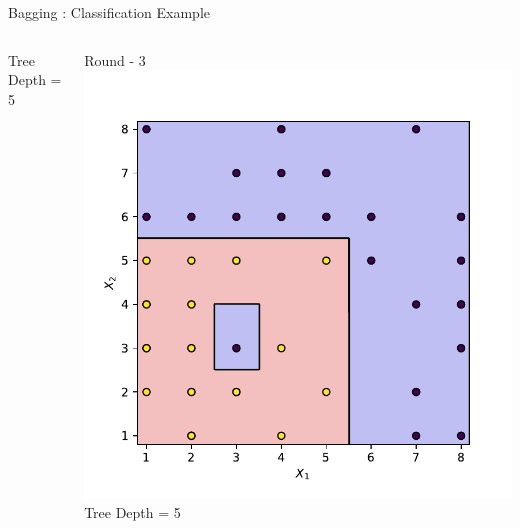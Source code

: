 \documentclass[aspectratio=169,10pt]{beamer}
\newcommand{\fitpic}[1]{\begin{adjustbox}{max width=\linewidth, max totalheight=0.78\textheight}#1\end{adjustbox}}
\begin{document}
\begin{frame}{Bagging : Classification Example}
\begin{columns}
\begin{column}{0.33\textwidth}
      Tree Depth = 5
    \end{column}
    \pause\begin{column}{0.33\textwidth}\centering
      Round - 3\\
      \fitpic{\includegraphics[width=\linewidth]{../assets/ensemble/figures/decision-boundary-2}}\\
      Tree Depth = 5
    \end{column}
  \end{columns}


\end{frame}
\end{document}
